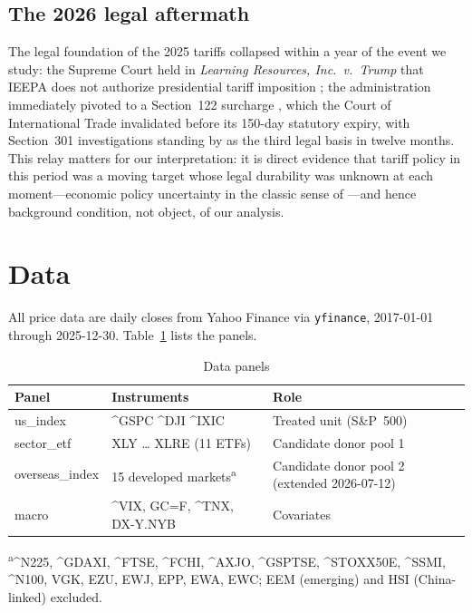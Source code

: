 \documentclass[11pt,a4paper]{article}
\begin{document}
\subsection{The 2026 legal aftermath}

The legal foundation of the 2025 tariffs collapsed within a year of the
event we study: the Supreme Court held in \emph{Learning Resources, Inc.\
v.\ Trump} that IEEPA does not authorize presidential tariff imposition
\citep{learningresources2026}; the administration immediately pivoted to a
Section~122 surcharge \citep{section122tariffs2026}, which the Court of
International Trade invalidated \citep{citsection1222026} before its
150-day statutory expiry, with Section~301 investigations
\citep{section301investigations2026} standing by as the third legal basis
in twelve months. This relay matters for our interpretation: it is direct
evidence that tariff policy in this period was a moving target whose legal
durability was unknown at each moment---economic policy uncertainty in the
classic sense of \citet{baker2016}---and hence background condition, not
object, of our analysis.

\section{Data}\label{sec:data}

All price data are daily closes from Yahoo Finance via \texttt{yfinance},
2017-01-01 through 2025-12-30. Table~\ref{tab:data} lists the panels.

\begin{table}[htbp]
\centering
\caption{Data panels}
\label{tab:data}
\small
\begin{tabular}{@{}lp{5.4cm}p{7.4cm}@{}}
\toprule
Panel & Instruments & Role \\
\midrule
us\_index & \^{}GSPC \^{}DJI \^{}IXIC & Treated unit (S\&P~500) \\
sector\_etf & XLY \ldots{} XLRE (11 ETFs) & Candidate donor pool 1 \\
overseas\_index & 15 developed markets\textsuperscript{a} & Candidate donor
pool 2 (extended 2026-07-12) \\
macro & \^{}VIX, GC=F, \^{}TNX, DX-Y.NYB & Covariates \\
\bottomrule
\end{tabular}

\vspace{2pt}
\noindent\textsuperscript{a}\small \^{}N225, \^{}GDAXI, \^{}FTSE, \^{}FCHI,
\^{}AXJO, \^{}GSPTSE, \^{}STOXX50E, \^{}SSMI, \^{}N100, VGK, EZU, EWJ, EPP,
EWA, EWC; EEM (emerging) and HSI (China-linked) excluded.
\normalsize
\end{table}
\end{document}
